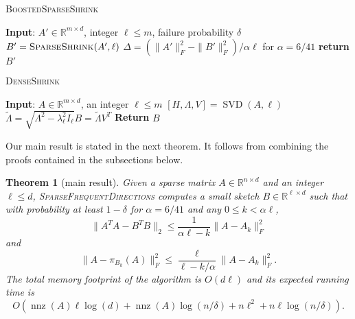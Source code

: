 \documentclass[11pt]{article}
\newcommand{\R}{\mathbb{R}}
\newcommand{\svd}{\operatorname{SVD}}
\newcommand{\nnz}{\operatorname{nnz}}
\newcommand{\sfd}{\textsc{SparseFrequentDirections}\xspace}
\newcommand{\SSh}{\textsc{SparseShrink}\xspace}
\newcommand{\BSSh}{\textsc{BoostedSparseShrink}\xspace}
\newtheorem{theorem}{Theorem}[section]
\begin{document}
\begin{algorithm}[H]
\begin{algorithmic}
\caption{\BSSh}
\label{alg:BoostedSparseShrink}
\STATE \textbf{Input}: $A' \in \R^{m \times d}$, integer $ \ell \le m$, failure probability $\delta$
  \STATE $B' = \SSh(A',\ell)$
  \STATE $\Delta = (\|A'\|_F^2 - \|B'\|_F^2) / \alpha \ell$ \;\;\; for $\alpha = 6/41 $
    \STATE \textbf{return} $B'$
  \ENDIF
\ENDWHILE
\end{algorithmic}
\end{algorithm}


\begin{algorithm}[H]
\caption{\textsc{DenseShrink}}
\label{alg:DenseFD}
\begin{algorithmic}
\STATE \textbf{Input}: $A \in \R^{m \times d}$, an integer $\ell \le m$
\STATE $[H,\Lambda,V] = \svd(A,\ell)$ \STATE $\tilde \Lambda = \sqrt{\Lambda^2 - \lambda^2_\ell I_\ell}$\STATE $B = \tilde \Lambda V^T$
\STATE \textbf{Return} $B$ \end{algorithmic}
\end{algorithm}





Our main result is stated in the next theorem. It follows from combining the proofs contained in the subsections below.
\begin{theorem}[main result]\label{thm:bounds}
Given a sparse matrix $A\in\R^{n\times d}$ and an integer $\ell \le d$, \sfd computes a small sketch $B \in \R^{\ell \times d}$ such that with probability at least $1-\delta$ for $\alpha = 6/41$ and any $0 \leq k < \alpha \ell$,
\[
\|A^T A - B^T B\|_2 \leq \frac{1}{\alpha \ell - k} \|A -A_k\|_F^2 
\]
and
\[
\|A - \pi_{B_k}(A)\|_F^2 \leq \frac{\ell}{\ell - k/\alpha} \|A - A_k\|_F^2.
\]
The total memory footprint of the algorithm is $O(d\ell)$ and its expected running time is 
\[
O\left( \nnz(A)\ell \log(d) +  \nnz(A)\log (n/\delta)+ n\ell^2 + n\ell\log(n/\delta) \right). 
\]
\end{theorem}
\end{document}
